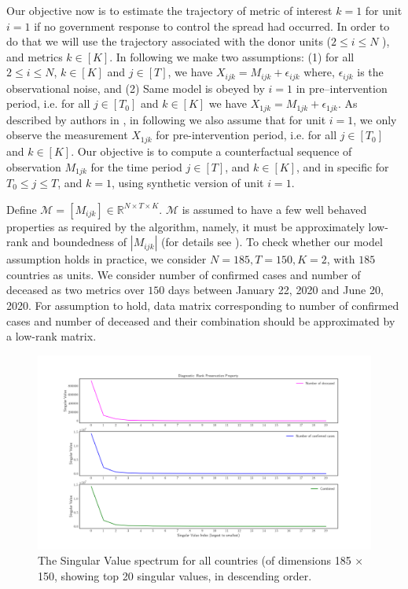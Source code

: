 \documentclass[12pt]{article}
\begin{document}
		Our objective now is to estimate the trajectory of metric of interest $k = 1$  for unit $i = 1$ if no government response to control the spread had occurred. In order to do that we will use the trajectory associated with the donor units ($2 \leq i \leq N$ ), and metrics $k \in [K ]$. In following we make two assumptions: (1) for all $2 \leq i \leq N$, $k \in [K]$ and $j \in [T]$, we have  $X_{ijk} = M_{ijk} + \epsilon_{ijk}$ where, $\epsilon_{ijk}$ is the observational noise, and (2) Same model is obeyed by $i=1$ in pre--intervention period, i.e. for all $j \in [T_0]$ and $k \in [K]$ we have $X_{1jk} = M_{1jk} + \epsilon_{1jk}$. As described by authors in \cite{AMSS19}, in following we also assume that for unit $i=1$, we only observe the measurement $X_{1jk}$ for pre-intervention period, i.e. for all $j \in [T_0]$ and $k \in [K]$. Our objective is to compute a counterfactual sequence of observation $M_{1jk}$ for the time period $j \in [T]$, and $k \in [K]$, and in specific for $T_0 \leq j \leq T$, and $k = 1$, using synthetic version of unit $i=1$.\par
		
		Define $\mathcal{M} = [M_{ijk}] \in \mathbb{R}^{N \times T \times K}$. $\mathcal{M}$ is assumed to have a few well behaved properties as required by the algorithm, namely, it must be approximately low-rank and boundedness of $\left|M_{ijk}\right|$ (for details see \cite{AMSS19}). To check whether our model assumption holds in practice, we consider $N=185, T=150, K=2$, with $185$ countries as units. We consider number of confirmed cases and number of deceased as two metrics over $150$ days between January 22, 2020 and June 20, 2020. For assumption to hold, data matrix corresponding to number of confirmed cases and number of deceased and their combination should be approximated by a low-rank matrix. 
		
		\begin{figure}[ht]
			\includegraphics[width=\textwidth]{rd}
			\caption{The Singular Value spectrum for all countries (of dimensions 185 × 150, showing top 20 singular values, in descending order.} 
			\label{fig1} 
		\end{figure}
	
\end{document}
